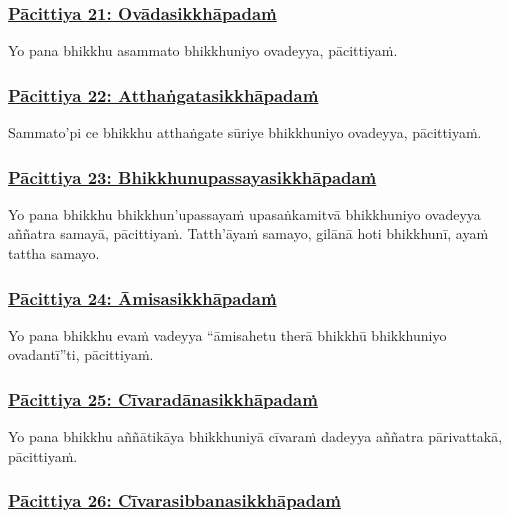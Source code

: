 \subsubsection*{\hyperref[exp]{Pācittiya 21: Ovādasikkhāpadaṁ}}
\label{pac21}

Yo pana bhikkhu asammato bhikkhuniyo ovadeyya, pācittiyaṁ.

\subsubsection*{\hyperref[exp22]{Pācittiya 22: Atthaṅgatasikkhāpadaṁ}}
\label{pac22}

Sammato'pi ce bhikkhu atthaṅgate sūriye bhikkhuniyo ovadeyya, pācittiyaṁ.

\subsubsection*{\hyperref[exp23]{Pācittiya 23: Bhikkhunupassayasikkhāpadaṁ}}
\label{pac23}

Yo pana bhikkhu bhikkhun'upassayaṁ upasaṅkamitvā bhikkhuniyo ovadeyya aññatra samayā, pācittiyaṁ. Tatth'āyaṁ samayo, gilānā hoti bhikkhunī, ayaṁ tattha samayo.

\subsubsection*{\hyperref[exp24]{Pācittiya 24: Āmisasikkhāpadaṁ}}
\label{pac24}

Yo pana bhikkhu evaṁ vadeyya “āmisahetu therā bhikkhū bhikkhuniyo ovadantī”ti, pācittiyaṁ.

\subsubsection*{\hyperref[exp25]{Pācittiya 25: Cīvaradānasikkhāpadaṁ}}
\label{pac25}

Yo pana bhikkhu aññātikāya bhikkhuniyā cīvaraṁ dadeyya aññatra pārivattakā, pācittiyaṁ.

\subsubsection*{\hyperref[exp26]{Pācittiya 26: Cīvarasibbanasikkhāpadaṁ}}
\label{pac26}

